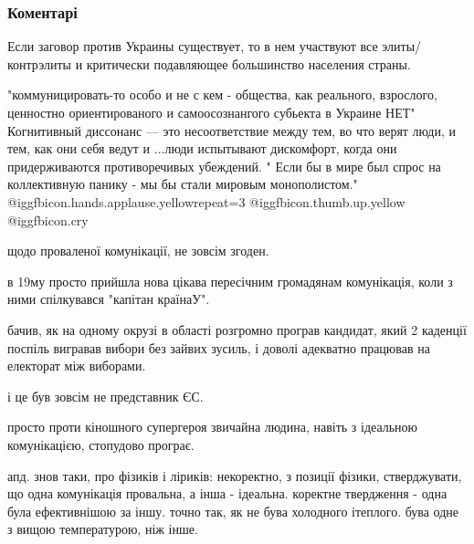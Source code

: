  
 
 
 
 
\subsubsection{Коментарі}
\label{sec:02_11_2021.fb.miheev_vladislav.1.isteriki.cmt}

\begin{itemize} %

Если заговор против Украины существует, то в нем участвуют все элиты/контрэлиты
и критически подавляющее большинство населения страны.



"коммуницировать-то особо и не с кем - общества, как реального, взрослого,
ценностно ориентированого и самоосознангого субьекта в Украине НЕТ" Когнитивный
диссонанс — это несоответствие между тем, во что верят люди, и тем, как они
себя ведут и ...люди испытывают дискомфорт, когда они придерживаются
противоречивых убеждений. " Если бы в мире был спрос на коллективную панику -
мы бы стали мировым монополистом." @igg{fbicon.hands.applause.yellow}{repeat=3}  @igg{fbicon.thumb.up.yellow}  @igg{fbicon.cry} 


щодо проваленої комунікації, не зовсім згоден.

в 19му просто прийшла нова цікава пересічним громадянам комунікація, коли з
ними спілкувався "капітан країнаУ".

бачив, як на одному окрузі в області розгромно програв кандидат, який 2
каденції поспіль вигравав вибори без зайвих зусиль, і доволі адекватно працював
на електорат між виборами.

і це був зовсім не представник ЄС.

просто проти кіношного супергероя звичайна людина, навіть з ідеальною
комунікацією, стопудово програє.

апд. знов таки, про фізиків і ліриків: некоректно, з позиції фізики,
стверджувати, що одна комунікація провальна, а інша - ідеальна. коректне
твердження - одна була ефективнішою за іншу. точно так, як не бува холодного
ітеплого. бува одне з вищою температурою, ніж інше.


\end{itemize}
